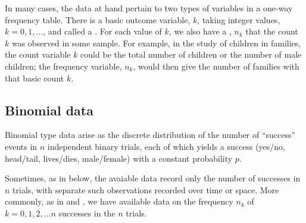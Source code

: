 \documentclass[11pt]{book}\usepackage[]{graphicx}\usepackage[]{color}
\begin{document}
In many cases, the data at hand pertain to two types of variables in a one-way
frequency table. There is a basic outcome variable, $k$, taking integer values,
$k = 0, 1, \dots$, and called a .  For each value of $k$, we also have
a , $n_k$ that the count $k$ was observed in some sample.
For example, in the study of children in families, the count variable
$k$ could be the total number of children or the number of male children;
the frequency variable, $n_k$, would then give the number of families with that
basic count $k$.

\subsection{Binomial data}\label{sec:binom-data}
Binomial type data arise as the discrete distribution of the number of
``success'' events in $n$ independent binary trials, each of which 
yields a success (yes/no, head/tail, lives/dies, male/female) with a constant probability $p$. 

Sometimes, as in 
below, the avaiable data record only the number of successes
in $n$ trials, with separate such observations recorded over
time or space.  More commonly, as in 
and ,
we have available data on the frequency $n_k$
of $k = 0, 1, 2, \dots n$ successes in the $n$ trials.
\end{document}

